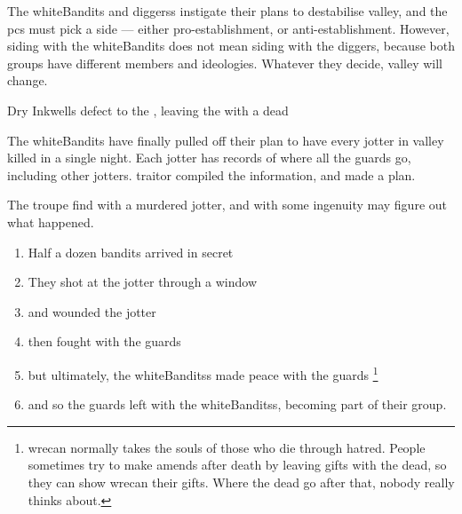 \label{risingTitles}

\noindent
The \gls{whiteBandits} and \glspl{diggers} instigate their plans to destabilise \gls{valley}, and the \glspl{pc} must pick a side --- either pro-establishment, or anti-establishment.
However, siding with the \gls{whiteBandits} does not mean siding with the \gls{diggers}, because both groups have different members and ideologies.
Whatever they decide, \gls{valley} will change.

\null

{Dry Inkwells}%
{ defect to the , leaving the  with a dead }%

\begin{exampletext}
  The \gls{whiteBandits} have finally pulled off their plan to have every \gls{jotter} in \gls{valley} killed in a single night.
  Each \gls{jotter} has records of where all the \glspl{guard} go, including other \glspl{jotter}.
  \Gls{traitor} compiled the information, and made a plan.
\end{exampletext}

The troupe find  with a murdered \gls{jotter}, and with some ingenuity may figure out what happened.

\begin{enumerate}
  \item
  Half a dozen bandits arrived in secret
  \item
  They shot at the \gls{jotter} through a window
  \item
  and wounded the \gls{jotter}
  \item
  then fought with the \glspl{guard}
  \item
  but ultimately, the \glspl{whiteBandits} made peace with the \glspl{guard}
  \footnote{\Gls{wrecan} normally takes the souls of those who die through hatred.  People sometimes try to make amends after death by leaving gifts with the dead, so they can show \gls{wrecan} their gifts.  Where the dead go after that, nobody really thinks about.}
  \item
  and so the \glspl{guard} left with the \glspl{whiteBandits}, becoming part of their group.
\end{enumerate}

